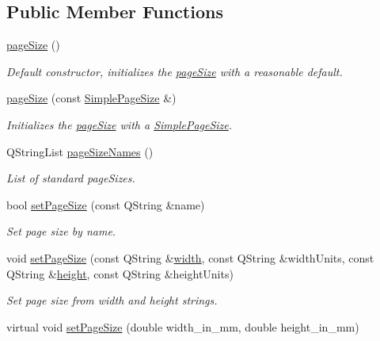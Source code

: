 \subsection*{Public Member Functions}
\begin{DoxyCompactItemize}
\item 
\hyperlink{classpageSize_aee12acdd4265fc3715734fbe24cff4c8}{page\+Size} ()
\begin{DoxyCompactList}\small\item\em Default constructor, initializes the \hyperlink{classpageSize}{page\+Size} with a reasonable default. \end{DoxyCompactList}\item 
\hyperlink{classpageSize_a12ad5a663012ca69b9e5f433c9ff332e}{page\+Size} (const \hyperlink{classSimplePageSize}{Simple\+Page\+Size} \&)
\begin{DoxyCompactList}\small\item\em Initializes the \hyperlink{classpageSize}{page\+Size} with a \hyperlink{classSimplePageSize}{Simple\+Page\+Size}. \end{DoxyCompactList}\item 
Q\+String\+List \hyperlink{classpageSize_a074be4f8071c9acf4b54b4cd463f4d7b}{page\+Size\+Names} ()
\begin{DoxyCompactList}\small\item\em List of standard page\+Sizes. \end{DoxyCompactList}\item 
bool \hyperlink{classpageSize_a64ac04a797c6416e6fe8fb30f7eb6b38}{set\+Page\+Size} (const Q\+String \&name)
\begin{DoxyCompactList}\small\item\em Set page size by name. \end{DoxyCompactList}\item 
void \hyperlink{classpageSize_aa7a848d77ae50135e5d49795db0fbb65}{set\+Page\+Size} (const Q\+String \&\hyperlink{classSimplePageSize_a5866f4c04635b09ec065a1fc45f9d1df}{width}, const Q\+String \&width\+Units, const Q\+String \&\hyperlink{classSimplePageSize_a8df6b43628bff9c8b53f26cc478640c5}{height}, const Q\+String \&height\+Units)
\begin{DoxyCompactList}\small\item\em Set page size from width and height strings. \end{DoxyCompactList}\item 
virtual void \hyperlink{classpageSize_a9cdfa8d2bc570ce7ab308bad858e95b6}{set\+Page\+Size} (double width\+\_\+in\+\_\+mm, double height\+\_\+in\+\_\+mm)

\end{DoxyCompactItemize}
